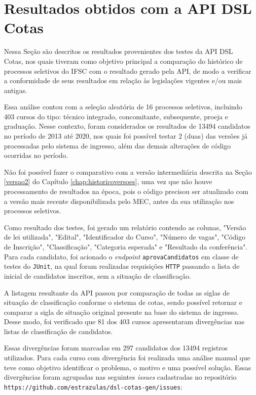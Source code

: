 \section{Resultados obtidos com a API DSL Cotas}
\label{sec:avaliacaoapi}

Nessa Seção são descritos os resultados provenientes dos testes da API DSL Cotas, nos quais tiveram como objetivo principal a comparação do histórico de processos seletivos do \gls{IFSC} com o resultado gerado pela API, de modo a verificar a conformidade de seus resultados em relação às legislações vigentes e/ou mais antigas.

Essa análise contou com a seleção aleatória de 16 processos seletivos, incluindo 403 cursos do tipo: técnico integrado, concomitante, subsequente, proeja e graduação. Nesse contexto, foram considerados os resultados de 13494 candidatos no período de 2013 até 2020, nos quais foi possível testar 2 (duas) das versões já processadas pelo sistema de ingresso, além das demais alterações de código ocorridas no período. 

Não foi possível fazer o comparativo com a versão intermediária descrita na Seção \ref{versao2} do Capítulo \ref{chap:historicoversoes}, uma vez que não houve processamento de resultados na época, pois o código precisou ser atualizado com a versão mais recente disponibilizada pelo MEC, antes da sua utilização nos processos seletivos.

Como resultado dos testes, foi gerado um relatório contendo as colunas, "Versão de lei utilizada", "Edital", "Identificador do Curso", "Número de vagas", "Código de Inscrição", "Classificação", "Categoria esperada" e "Resultado da conferência". Para cada candidato, foi acionado o \textit{endpoint} \texttt{aprovaCandidatos} em classe de testes do \texttt{JUnit}, na qual foram realizadas requisições \texttt{HTTP} passando a lista de inicial de candidatos inscritos, sem a situação de classificação.

A listagem resultante da API passou por comparação de todas as siglas de situação de classificação conforme o sistema de cotas, sendo possível retornar e comparar a sigla de situação original presente na base do sistema de ingresso. Desse modo, foi verificado que 81 dos 403 cursos apresentaram divergências nas listas de classificação de candidatos.

Essas divergências foram marcadas em 297 candidatos dos 13494 registros utilizados. Para cada curso com divergência foi realizada uma análise manual que teve como objetivo identificar o problema, o motivo e uma possível solução. Essas divergências foram agrupadas nas seguintes \textit{issues} cadastradas no repositório \texttt{https://github.com/estrazulas/dsl-cotas-gen/issues}:

